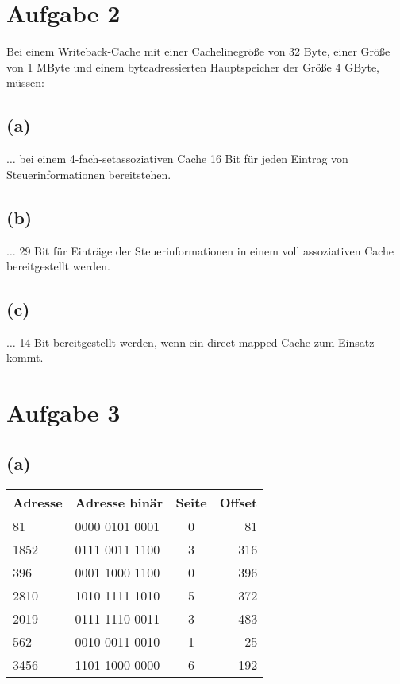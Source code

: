 \documentclass[12pt,a4paper]{scrartcl}
\begin{document}
	\section*{Aufgabe 2}
		Bei einem Writeback-Cache mit einer Cachelinegröße von 32 Byte, einer Größe von 1 MByte und einem byteadressierten Hauptspeicher der Größe 4 GByte, müssen:
		\subsection*{(a)}
		$\dotsc$ bei einem 4-fach-setassoziativen Cache 16 Bit für jeden Eintrag von Steuerinformationen bereitstehen.
		
		\subsection*{(b)}
		$\dotsc$ 29 Bit für Einträge der Steuerinformationen in einem voll assoziativen Cache bereitgestellt werden.
		
		\subsection*{(c)}
		$\dotsc$ 14 Bit bereitgestellt werden, wenn ein direct mapped Cache zum Einsatz kommt.
	\newpage
	\section*{Aufgabe 3}
		\subsection*{(a)}
		\begin{longtable}{|l|l|c|r|}
			\hline
			Adresse&Adresse binär&Seite&Offset\\\hline\hline
			  81&0000 0101 0001&0&81\\\hline
			1852&0111 0011 1100&3&316\\\hline
			 396&0001 1000 1100&0&396\\\hline
			2810&1010 1111 1010&5&372\\\hline
			2019&0111 1110 0011&3&483\\\hline
			 562&0010 0011 0010&1&25\\\hline
			3456&1101 1000 0000&6&192\\\hline
		\end{longtable}
\end{document}
